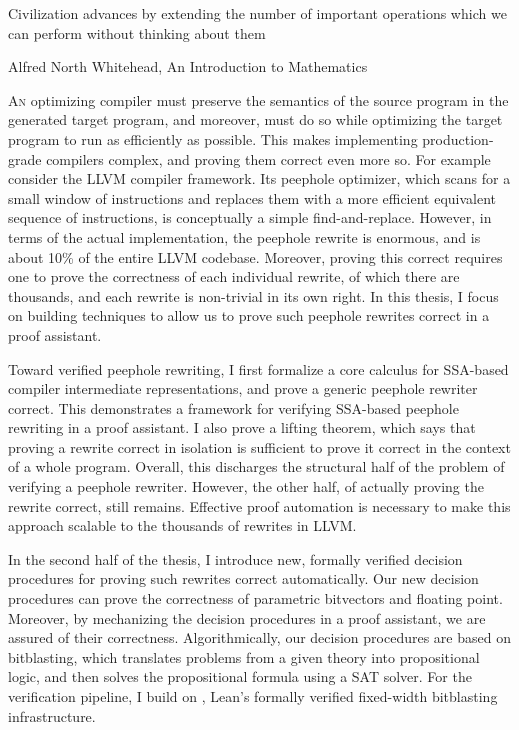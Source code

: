 \epigraph{Civilization advances by extending the number of important operations which we can perform without thinking about them}{Alfred North Whitehead, An Introduction to Mathematics}

\lettrine{A}n optimizing compiler must preserve the semantics of the source program in the generated target program,
and moreover, must do so while optimizing the target program to run as efficiently as possible.
This makes implementing production-grade compilers complex, and proving them correct even more so.
For example consider the LLVM compiler framework. Its peephole optimizer,
which scans for a small window of instructions and replaces them with a more efficient equivalent sequence of instructions, is conceptually a simple find-and-replace.
However, in terms of the actual implementation, the peephole rewrite is enormous, and is about 10\% of the entire LLVM codebase.
Moreover, proving this correct requires one to prove the correctness of each individual rewrite, of which there are thousands,
and each rewrite is non-trivial in its own right.
In this thesis, I focus on building techniques to allow us to prove such peephole rewrites correct in a proof assistant.

Toward verified peephole rewriting, I first formalize a core calculus for SSA-based compiler intermediate representations,
and prove a generic peephole rewriter correct.
This demonstrates a framework for verifying SSA-based peephole rewriting in a proof assistant.
I also prove a lifting theorem,
which says that proving a rewrite correct in isolation is sufficient to prove it correct in the context of a whole program.
Overall, this discharges the structural half of the problem of verifying a peephole rewriter.
However, the other half, of actually proving the rewrite correct, still remains.
Effective proof automation is necessary to make this approach scalable to the thousands of rewrites in LLVM.

In the second half of the thesis, I introduce new, formally verified decision procedures for proving such rewrites correct automatically.
Our new decision procedures can prove the correctness of parametric bitvectors and floating point.
Moreover, by mechanizing the decision procedures in a proof assistant, we are assured of their correctness.
Algorithmically, our decision procedures are based on bitblasting,
which translates problems from a given theory into propositional logic,
and then solves the propositional formula using a SAT solver.
For the verification pipeline, I build on \bvdecide{}, Lean's formally verified fixed-width bitblasting infrastructure.

